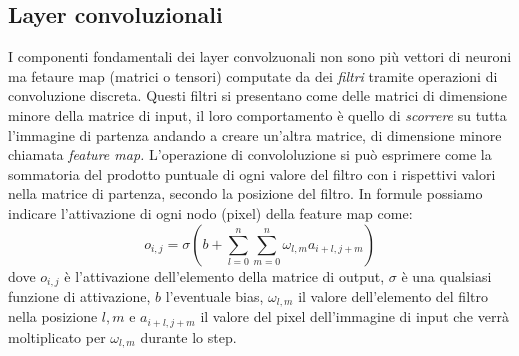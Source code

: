 \documentclass[12pt,a4paper,openright,twoside]{report}
\begin{document}
\subsection{Layer convoluzionali}
I componenti fondamentali dei layer convolzuonali non sono più vettori di neuroni ma fetaure map (matrici o tensori) computate da dei \emph{filtri} tramite operazioni di convoluzione discreta.
Questi filtri si presentano come delle matrici di dimensione minore della matrice di input, il loro comportamento è quello di \emph{scorrere} su tutta l'immagine di partenza andando a creare un'altra matrice, di dimensione minore chiamata \emph{feature map.}
L'operazione di convololuzione si può esprimere come la sommatoria del prodotto puntuale di ogni valore del filtro con i rispettivi valori nella matrice di partenza, secondo la posizione del filtro.
\newpage
In formule possiamo indicare l'attivazione di ogni nodo (pixel) della feature map come: 
\begin{equation}
    o_{i,j} = \sigma(b + \sum _{l=0}^{n}\sum _{m=0}^{n}\omega_{l,m}a_{i+l, j+m})
\end{equation}
dove $o_{i,j}$ è l'attivazione dell'elemento della matrice di output, $\sigma$ è una qualsiasi funzione di attivazione, $b$ l'eventuale bias, $\omega_{l,m}$ il valore dell'elemento del filtro nella posizione $l,m$ e $a_{i+l, j+m}$ il valore del pixel dell'immagine di input che verrà moltiplicato per $\omega_{l,m}$ durante lo step.
\end{document}
